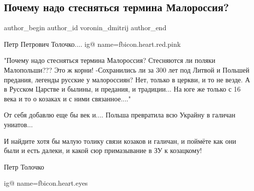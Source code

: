  
 
 
 
 
 
\subsection{Почему надо стесняться термина Малороссия?}
\label{sec:23_08_2021.fb.voronin_dmitrij.1.malorossia_tolochko}
 
\ifcmt
 author_begin
   author_id voronin_dmitrij
 author_end
\fi

Петр Петрович Толочко....
\ifcmt
  ig@ name=fbicon.heart.red.pink
\fi

"Почему надо стесняться термина Малороссия?
Стесняются ли поляки Малопольши???
Это ж корни!
-Сохранились ли за 300 лет под Литвой и Польшей предания, легенды русские у малороссиян?
Нет, только в церкви, и то не везде.
А в Русском Царстве и былины, и предания, и традиции...
На юге же только с 16 века и то о козаках и с ними связанное...."

От себя добавлю еще бы век и.... Польша превратила всю Украйну в галичан униатов...

И найдите хотя бы малую толику связи козаков и галичан, и поймёте как они были и
есть далеки, и какой сюр примазывание в ЗУ к козацкому!

Петр Толочко 

\ifcmt
  ig@ name=fbicon.heart.eyes 
\fi
